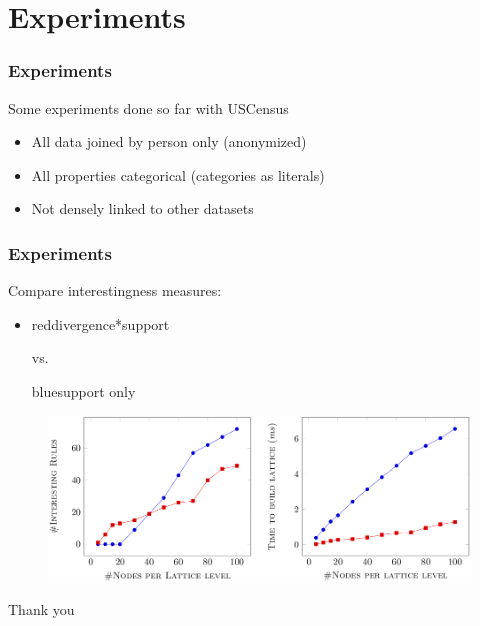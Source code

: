 \documentclass{beamer}
\begin{document}
\section{Experiments}
\begin{frame}
\frametitle{Experiments}
  Some experiments done so far with USCensus
  \begin{itemize}
   \item All data joined by person only (anonymized)
   \item All properties categorical (categories as literals)
   \item Not densely linked to other datasets
  \end{itemize}
\end{frame}
\begin{frame}
\frametitle{Experiments}
 Compare interestingness measures:
 \begin{itemize}
  \item \begin{color}{red}divergence*support\end{color} vs. \begin{color}{blue}support only\end{color}
 \end{itemize}
 \begin{figure}
  \includegraphics[height=0.5\textheight]{./Figures/plots}
 \end{figure}
\end{frame}
\begin{frame}
\Huge{\centerline{Thank you}}
\end{frame}
\end{document}
